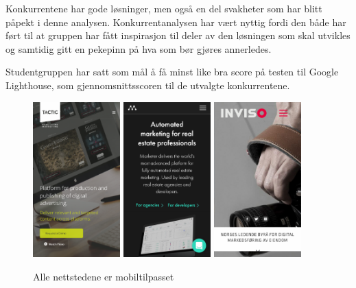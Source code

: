 Konkurrentene har gode løsninger, men også en del svakheter som har blitt påpekt i denne analysen. Konkurrentanalysen har vært nyttig fordi den både har ført til at gruppen har fått inspirasjon til deler av den løsningen som skal utvikles og samtidig gitt en pekepinn på hva som bør gjøres annerledes.

Studentgruppen har satt som mål å få minst like bra score på testen til Google Lighthouse, som gjennomsnittsscoren til de utvalgte konkurrentene.
\begin{figure}[H]
    \begin{center}
        \includegraphics[width=0.3\textwidth]{line/tacticrealtime_com_(iPhone_6_7_8).png}
        \includegraphics[width=0.3\textwidth]{line/marketer_tech_(iPhone_6_7_8).png}
        \includegraphics[width=0.3\textwidth]{line/inviso_no_(iPhone_6_7_8).png}
        \caption{Alle nettstedene er mobiltilpasset}
        \label{fig:competitors-mobile}
    \end{center}
\end{figure}

